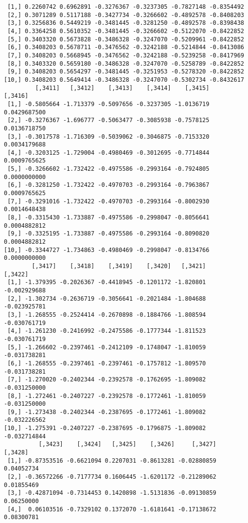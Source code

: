 \documentclass[
  letterpaper,
  DIV=11,
  numbers=noendperiod]{scrreprt}
\begin{document}
\begin{verbatim}
 [1,] 0.2260742 0.6962891 -0.3276367 -0.3237305 -0.7827148 -0.8354492
 [2,] 0.3071289 0.5117188 -0.3427734 -0.3266602 -0.4892578 -0.8408203
 [3,] 0.3256836 0.5449219 -0.3481445 -0.3281250 -0.4892578 -0.8398438
 [4,] 0.3364258 0.5610352 -0.3481445 -0.3266602 -0.5122070 -0.8422852
 [5,] 0.3403320 0.5673828 -0.3486328 -0.3247070 -0.5209961 -0.8422852
 [6,] 0.3408203 0.5678711 -0.3476562 -0.3242188 -0.5214844 -0.8413086
 [7,] 0.3408203 0.5668945 -0.3476562 -0.3242188 -0.5239258 -0.8417969
 [8,] 0.3403320 0.5659180 -0.3486328 -0.3247070 -0.5258789 -0.8422852
 [9,] 0.3408203 0.5654297 -0.3481445 -0.3251953 -0.5278320 -0.8422852
[10,] 0.3408203 0.5649414 -0.3486328 -0.3247070 -0.5302734 -0.8432617
         [,3411]   [,3412]    [,3413]    [,3414]    [,3415]      [,3416]
 [1,] -0.5805664 -1.713379 -0.5097656 -0.3237305 -1.0136719 0.0429687500
 [2,] -0.3276367 -1.696777 -0.5063477 -0.3085938 -0.7578125 0.0136718750
 [3,] -0.3017578 -1.716309 -0.5039062 -0.3046875 -0.7153320 0.0034179688
 [4,] -0.3203125 -1.729004 -0.4980469 -0.3012695 -0.7714844 0.0009765625
 [5,] -0.3266602 -1.732422 -0.4975586 -0.2993164 -0.7924805 0.0000000000
 [6,] -0.3281250 -1.732422 -0.4970703 -0.2993164 -0.7963867 0.0009765625
 [7,] -0.3291016 -1.732422 -0.4970703 -0.2993164 -0.8002930 0.0014648438
 [8,] -0.3315430 -1.733887 -0.4975586 -0.2998047 -0.8056641 0.0004882812
 [9,] -0.3325195 -1.733887 -0.4975586 -0.2993164 -0.8090820 0.0004882812
[10,] -0.3344727 -1.734863 -0.4980469 -0.2998047 -0.8134766 0.0000000000
        [,3417]    [,3418]    [,3419]    [,3420]   [,3421]      [,3422]
 [1,] -1.379395 -0.2026367 -0.4418945 -0.1201172 -1.820801 -0.002929688
 [2,] -1.302734 -0.2636719 -0.3056641 -0.2021484 -1.804688 -0.023925781
 [3,] -1.268555 -0.2524414 -0.2670898 -0.1884766 -1.808594 -0.030761719
 [4,] -1.261230 -0.2416992 -0.2475586 -0.1777344 -1.811523 -0.030761719
 [5,] -1.266602 -0.2397461 -0.2412109 -0.1748047 -1.810059 -0.031738281
 [6,] -1.268555 -0.2397461 -0.2397461 -0.1757812 -1.809570 -0.031738281
 [7,] -1.270020 -0.2402344 -0.2392578 -0.1762695 -1.809082 -0.031250000
 [8,] -1.272461 -0.2407227 -0.2392578 -0.1772461 -1.810059 -0.031250000
 [9,] -1.273438 -0.2402344 -0.2387695 -0.1772461 -1.809082 -0.032226562
[10,] -1.275391 -0.2407227 -0.2387695 -0.1796875 -1.809082 -0.032714844
          [,3423]    [,3424]   [,3425]    [,3426]     [,3427]    [,3428]
 [1,] -0.87353516 -0.6621094 0.2207031 -0.8613281 -0.02880859 0.04052734
 [2,] -0.36572266 -0.7177734 0.1606445 -1.6201172 -0.21289062 0.01855469
 [3,] -0.42871094 -0.7314453 0.1420898 -1.5131836 -0.09130859 0.06250000
 [4,]  0.06103516 -0.7329102 0.1372070 -1.6181641 -0.17138672 0.08300781

\end{verbatim}
\end{document}
